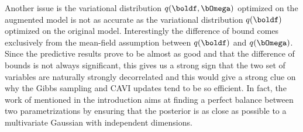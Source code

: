 Another issue is the variational distribution $q(\boldf, \bOmega)$ optimized on the augmented model is not as accurate as the variational distribution $q(\boldf)$ optimized on the original model.
Interestingly the difference of bound comes exclusively from the mean-field assumption between $q(\boldf)$ and $q(\bOmega)$.
Since the predictive results prove to be almost as good and that the difference of bounds is not always significant, this gives us a strong sign that the two set of variables are naturally strongly decorrelated and this would give a strong clue on why the Gibbs sampling and \ac{CAVI} updates tend to be so efficient.
In fact, the work of \citet{gorinovaAutomaticReparameterisationProbabilistic2020} mentioned in the introduction aims at finding a perfect balance between two parametrizations by ensuring that the posterior is as close as possible to a multivariate Gaussian with independent dimensions.




